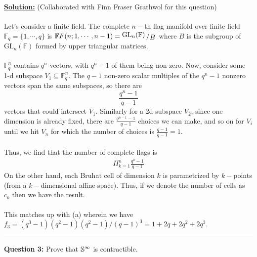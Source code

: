 \documentclass[11pt]{article}
\begin{document}
\vskip 0.5cm
\textbf{\underline{Solution:}}
(Collaborated with Finn Fraser Grathwol for this question)
\\
\\
Let's consider a finite field. The complete $n-$th flag manifold over finite field $\mathbb{F}_q = \{1, \cdots, q\}$ is $\mathbb{F} F(n; 1,\cdots,n-1) = \bigslant{\mathrm{GL}_n(\mathbb{F})}{B}$ where $B$ is the subgroup of $\mathrm{GL}_n(\mathbb{F})$ formed by upper triangular matrices.
\\
\\
$\mathbb{F}_q^n$ contains $q^n$ vectors, with $q^n - 1$ of them being non-zero. Now, consider some 1-d subspace $V_1 \subseteq \mathbb{F}_q^n$. The $q-1$ non-zero scalar multiples of the $q^n - 1$ nonzero vectors span the same subspaces, so there are $$ \frac{q^n-1}{q-1} $$ vectors that could intersect $V_1$. Similarly for a 2d subspace $V_2$, since one dimension is already fixed, there are $\frac{q^{n-1} - 1}{q-1}$ choices we can make, and so on for $V_i$ until we hit $V_n$ for which the number of choices is $\frac{q-1}{q-1} = 1$.
\\
\\
Thus, we find that the number of complete flags is 
\begin{align*}
  \Pi_{k = 1}^{n} \frac{q^k - 1}{q - 1} 
\end{align*}
On the other hand, each Bruhat cell of dimension $k$ is parametrized by $k-$points (from a $k-$dimensional affine space). Thus, if we denote the number of cells as $c_k$ then we have the result.
\\
\\
This matches up with (a) wherein we have $f_3 = \left(q^3 - 1\right)\left(q^2 - 1\right)\left(q^2 - 1\right) / \left(q - 1\right)^3 = 1 + 2q + 2q^2 + 2q^3$.
\vskip 0.5cm
\hrule
\pagebreak



\begin{bluebox}
  \textbf{Question 3:} Prove that $\mathbb{S}^{\infty}$ is contractible.
\end{bluebox}
\end{document}
